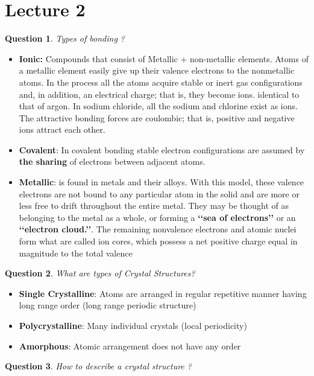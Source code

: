 \documentclass[13]{article}
\newtheorem{exer}{Question}
\begin{document}
\section{Lecture 2}
\begin{exer}
Types of bonding ?
\end{exer}
\begin{itemize}

	\item \textbf{Ionic:}  Compounds that consist of Metallic + non-metallic elements.
	Atoms of a metallic element easily give up their valence electrons to
	the nonmetallic atoms. In the process all the atoms acquire stable or
	inert gas configurations and, in addition, an electrical charge; that
	is, they become ions. identical to that of argon. In sodium chloride,
	all the sodium and chlorine exist as ions.  The attractive bonding
	forces are coulombic; that is, positive and negative ions attract
	each other.
\item \textbf{Covalent}: In covalent bonding stable electron configurations are assumed by \textbf{the sharing}  of electrons between adjacent atoms.
\item \textbf{Metallic}: is found in metals and their alloys. With this
	model, these valence electrons are not bound to any particular atom
	in the solid and are more or less free to drift throughout the entire
	metal.  They may be thought of as belonging to the metal as a whole,
	or forming a \textbf{‘‘sea of electrons’’}  or an \textbf{‘‘electron
	cloud.’’}. The remaining nonvalence electrons and atomic nuclei form
	what are called ion cores, which possess a net positive charge  equal
	in magnitude to the total valence  
\end{itemize} 
\begin{exer}
What are types of Crystal Structures?
\end{exer}
\begin{itemize}

	\item \textbf{Single Crystalline}: Atoms are arranged in regular repetitive manner having long range order (long range periodic structure) 
	\item \textbf{Polycrystalline}: Many individual crystals (local
		periodicity)
	\item\textbf{ Amorphous}: Atomic arrangement does not have any order

\end{itemize}
\begin{exer}
How to describe a crystal structure ?
\end{exer}
\end{document}
